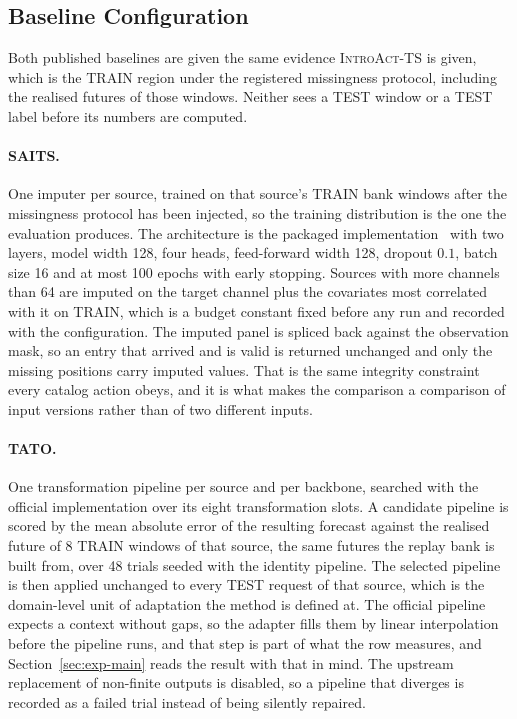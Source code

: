 \documentclass{article}
\newcommand{\introact}{\textsc{IntroAct-TS}}
\begin{document}
\subsection{Baseline Configuration}
\label{app:baseline-config}
Both published baselines are given the same evidence \introact{} is given, which is the TRAIN
region under the registered missingness protocol, including the realised futures of those
windows. Neither sees a TEST window or a TEST label before its numbers are computed.

\paragraph{SAITS.} One imputer per source, trained on that source's TRAIN bank windows after
the missingness protocol has been injected, so the training distribution is the one the
evaluation produces. The architecture is the packaged implementation~\citep{du2023pypots} with
two layers, model width 128, four heads, feed-forward width 128, dropout $0.1$, batch size 16
and at most 100 epochs with early stopping. Sources with more channels than
64 are imputed on the target channel plus the covariates most correlated with it
on TRAIN, which is a budget constant fixed before any run and recorded with the configuration.
The imputed panel is spliced back against the observation mask, so an entry that arrived and is
valid is returned unchanged and only the missing positions carry imputed values. That is the
same integrity constraint every catalog action obeys, and it is what makes the comparison a
comparison of input versions rather than of two different inputs.

\paragraph{TATO.} One transformation pipeline per source and per backbone, searched with the
official implementation over its eight transformation slots. A candidate pipeline is scored by
the mean absolute error of the resulting forecast against the realised future of
8 TRAIN windows of that source, the same futures the replay bank is built from,
over 48 trials seeded with the identity pipeline. The selected pipeline is then
applied unchanged to every TEST request of that source, which is the domain-level unit of
adaptation the method is defined at. The official pipeline expects a context without gaps, so
the adapter fills them by linear interpolation before the pipeline runs, and that step is
part of what the row measures, and Section~\ref{sec:exp-main} reads the result with that in
mind. The upstream replacement of non-finite outputs is disabled, so a pipeline that diverges
is recorded as a failed trial instead of being silently repaired.
\end{document}
